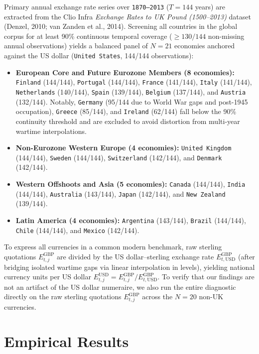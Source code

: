 \documentclass[11pt,a4paper]{article}
\begin{document}
Primary annual exchange rate series over \texttt{1870--2013} ($T = 144$ years) are extracted from the Clio Infra \emph{Exchange Rates to UK Pound (1500--2013)} dataset (Denzel, 2010; van Zanden et al., 2014). Screening all countries in the global corpus for at least 90\% continuous temporal coverage ($\ge 130/144$ non-missing annual observations) yields a balanced panel of $N = 21$ economies anchored against the US dollar (\texttt{United States}, 144/144 observations):
\begin{itemize}
    \item \textbf{European Core and Future Eurozone Members (8 economies):} \texttt{Finland} (144/144), \texttt{Portugal} (144/144), \texttt{France} (141/144), \texttt{Italy} (141/144), \texttt{Netherlands} (140/144), \texttt{Spain} (139/144), \texttt{Belgium} (137/144), and \texttt{Austria} (132/144). Notably, \texttt{Germany} (95/144 due to World War gaps and post-1945 occupation), \texttt{Greece} (85/144), and \texttt{Ireland} (62/144) fall below the 90\% continuity threshold and are excluded to avoid distortion from multi-year wartime interpolations.
    \item \textbf{Non-Eurozone Western Europe (4 economies):} \texttt{United Kingdom} (144/144), \texttt{Sweden} (144/144), \texttt{Switzerland} (142/144), and \texttt{Denmark} (142/144).
    \item \textbf{Western Offshoots and Asia (5 economies):} \texttt{Canada} (144/144), \texttt{India} (144/144), \texttt{Australia} (143/144), \texttt{Japan} (142/144), and \texttt{New Zealand} (139/144).
    \item \textbf{Latin America (4 economies):} \texttt{Argentina} (143/144), \texttt{Brazil} (144/144), \texttt{Chile} (144/144), and \texttt{Mexico} (142/144).
\end{itemize}

To express all currencies in a common modern benchmark, raw sterling quotations $E_{t,j}^{\mathrm{GBP}}$ are divided by the US dollar--sterling exchange rate $E_{t,\mathrm{USD}}^{\mathrm{GBP}}$ (after bridging isolated wartime gaps via linear interpolation in levels), yielding national currency units per US dollar $E_{t,j}^{\mathrm{USD}} = E_{t,j}^{\mathrm{GBP}} / E_{t,\mathrm{USD}}^{\mathrm{GBP}}$. To verify that our findings are not an artifact of the US dollar numeraire, we also run the entire diagnostic directly on the raw sterling quotations $E_{t,j}^{\mathrm{GBP}}$ across the $N = 20$ non-UK currencies.

\section{Empirical Results}
\end{document}
